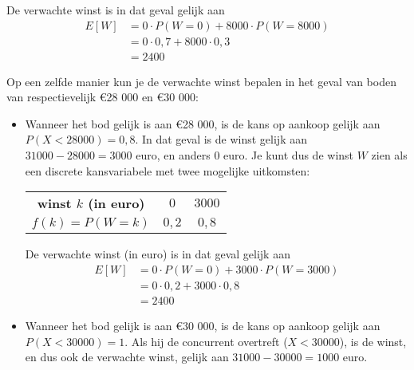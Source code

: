 \begin{enumerate}[label=(\alph*)]
{        De verwachte winst is in dat geval gelijk aan 
        \begin{align*}
            E[W]    &= 0 \cdot P(W=0) + 8 000 \cdot P(W = 8 000) \\
                    &= 0 \cdot 0,7 + 8 000 \cdot 0,3 \\
                    &= 2 400
        \end{align*}

        Op een zelfde manier kun je de verwachte winst bepalen in het geval van boden van respectievelijk \euro 28 000 en \euro 30 000:
        \begin{itemize}
            \item Wanneer het bod gelijk is aan \euro 28 000, is de kans op aankoop gelijk aan $P(X<28 000) = 0,8$.
            In dat geval is de winst gelijk aan $31 000 - 28 000 = 3 000$ euro, en anders $0$ euro. 
            Je kunt dus de winst $W$ zien als een discrete kansvariabele met twee mogelijke uitkomsten:
            \begin{center}
                \begin{tabular}{ccc}
                    \toprule
                        {\bfseries winst $k$ (in euro)} & $0$ & $3 000$\\
                    \cmidrule{1-1} \cmidrule{2-2} \cmidrule{3-3}
                        {\bfseries $f(k)=P(W=k)$} & $0,2$ & $0,8$ \\
                    \bottomrule
                \end{tabular}
            \end{center}
            De verwachte winst (in euro) is in dat geval gelijk aan 
            \begin{align*}
                E[W]    &= 0 \cdot P(W=0) + 3 000 \cdot P(W = 3 000) \\
                        &= 0 \cdot 0,2 + 3 000 \cdot 0,8 \\
                        &= 2 400
            \end{align*}
            
            \item Wanneer het bod gelijk is aan \euro 30 000, is de kans op aankoop gelijk aan $P(X<30 000) = 1$.
            Als hij de concurrent overtreft ($X < 30 000$), is de winst, en dus ook de verwachte winst, gelijk aan $31 000 - 30 000 = 1 000$ euro.
        \end{itemize}
    }


\end{enumerate}
